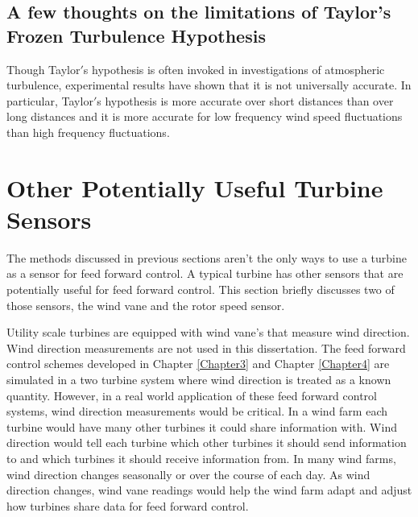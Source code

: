 \subsection{A few thoughts on the limitations of Taylor's Frozen Turbulence Hypothesis}
Though Taylor$'$s hypothesis is often invoked in investigations of atmospheric turbulence, experimental results have shown that it is not universally accurate.  In particular, Taylor$'$s hypothesis is more accurate over short distances than over long distances and it is more accurate for low frequency wind speed fluctuations than high frequency fluctuations. \cite{higgins2012, schlipf2010}


\section{Other Potentially Useful Turbine Sensors} \label{section2-6}

The methods discussed in previous sections aren't the only ways to use a turbine as a sensor for feed forward control. A typical turbine has other sensors that are potentially useful for feed forward control. This section briefly discusses two of those sensors, the wind vane and the rotor speed sensor.

Utility scale turbines are equipped with wind vane's that measure wind direction. Wind direction measurements are not used in this dissertation. The feed forward control schemes developed in Chapter \ref{Chapter3} and Chapter \ref{Chapter4} are simulated in a two turbine system where wind direction is treated as a known quantity. However, in a real world application of these feed forward control systems, wind direction measurements would be critical. In a wind farm each turbine would have many other turbines it could share information with. Wind direction would tell each turbine which other turbines it should send information to and which turbines it should receive information from. In many wind farms, wind direction changes seasonally or over the course of each day. As wind direction changes, wind vane readings would help the wind farm adapt and adjust how turbines share data for feed forward control.


